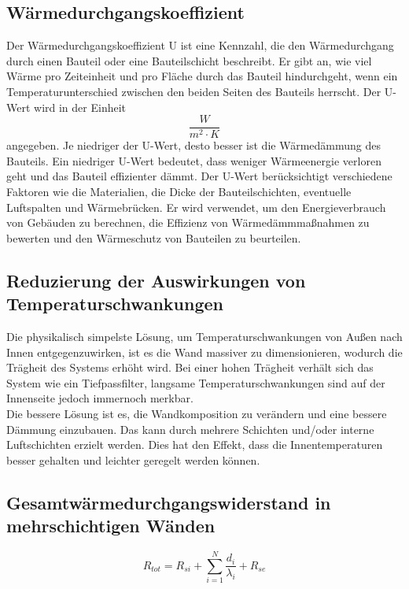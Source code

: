 \subsection{Wärmedurchgangskoeffizient}
Der Wärmedurchgangskoeffizient U ist eine Kennzahl, die den Wärmedurchgang durch einen Bauteil oder eine Bauteilschicht beschreibt. 
Er gibt an, wie viel Wärme pro Zeiteinheit und pro Fläche durch das Bauteil hindurchgeht, wenn ein Temperaturunterschied zwischen den beiden Seiten des Bauteils herrscht.
Der U-Wert wird in der Einheit $$\frac{W}{m^2 \cdot K}$$ angegeben. Je niedriger der U-Wert, desto besser ist die Wärmedämmung des Bauteils. 
Ein niedriger U-Wert bedeutet, dass weniger Wärmeenergie verloren geht und das Bauteil effizienter dämmt.
Der U-Wert berücksichtigt verschiedene Faktoren wie die Materialien, die Dicke der Bauteilschichten, eventuelle Luftspalten und Wärmebrücken. 
Er wird verwendet, um den Energieverbrauch von Gebäuden zu berechnen, die Effizienz von Wärmedämmmaßnahmen zu bewerten und den Wärmeschutz von Bauteilen zu beurteilen.

\subsection{Reduzierung der Auswirkungen von Temperaturschwankungen}

Die physikalisch simpelste Lösung, um Temperaturschwankungen von Außen nach Innen entgegenzuwirken, ist es die Wand massiver zu dimensionieren, wodurch die Trägheit des Systems erhöht wird.
Bei einer hohen Trägheit verhält sich das System wie ein Tiefpassfilter, langsame Temperaturschwankungen sind auf der Innenseite jedoch immernoch merkbar.
\\Die bessere Lösung ist es, die Wandkomposition zu verändern und eine bessere Dämmung einzubauen.
Das kann durch mehrere Schichten und/oder interne Luftschichten erzielt werden.
Dies hat den Effekt, dass die Innentemperaturen besser gehalten und leichter geregelt werden können.

\subsection{Gesamtwärmedurchgangswiderstand in mehrschichtigen Wänden}
\begin{equation}
	\label{eq:130723_Wärmedurchgangswiderstand}
	R_{tot}=R_{si}+\sum_{i=1}^N \frac{d_i}{\lambda_i}+R_{se}
\end{equation}

